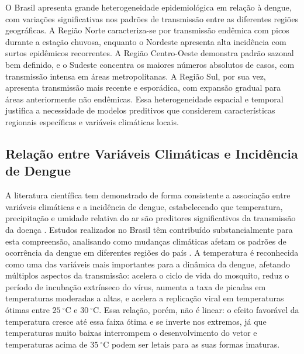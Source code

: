 O Brasil apresenta grande heterogeneidade epidemiológica em relação à dengue, com variações significativas nos padrões de transmissão entre as diferentes regiões geográficas. A Região Norte caracteriza-se por transmissão endêmica com picos durante a estação chuvosa, enquanto o Nordeste apresenta alta incidência com surtos epidêmicos recorrentes. A Região Centro-Oeste demonstra padrão sazonal bem definido, e o Sudeste concentra os maiores números absolutos de casos, com transmissão intensa em áreas metropolitanas. A Região Sul, por sua vez, apresenta transmissão mais recente e esporádica, com expansão gradual para áreas anteriormente não endêmicas. Essa heterogeneidade espacial e temporal justifica a necessidade de modelos preditivos que considerem características regionais específicas e variáveis climáticas locais.

\subsection{Relação entre Variáveis Climáticas e Incidência de Dengue}

A literatura científica tem demonstrado de forma consistente a associação entre variáveis climáticas e a incidência de dengue, estabelecendo que temperatura, precipitação e umidade relativa do ar são preditores significativos da transmissão da doença \cite{analysis_climate_factors_dengue,the_occurrence_dengue_weather_brazil}. Estudos realizados no Brasil têm contribuído substancialmente para esta compreensão, analisando como mudanças climáticas afetam os padrões de ocorrência da dengue em diferentes regiões do país \cite{the_occurrence_dengue_weather_brazil,health_impact_dengue_precipitation_sp}. A temperatura é reconhecida como uma das variáveis mais importantes para a dinâmica da dengue, afetando múltiplos aspectos da transmissão: acelera o ciclo de vida do mosquito, reduz o período de incubação extrínseco do vírus, aumenta a taxa de picadas em temperaturas moderadas a altas, e acelera a replicação viral em temperaturas ótimas entre $25~^\circ\mathrm{C}$ e $30~^\circ\mathrm{C}$. Essa relação, porém, não é linear: o efeito favorável da temperatura cresce até essa faixa ótima e se inverte nos extremos, já que temperaturas muito baixas interrompem o desenvolvimento do vetor e temperaturas acima de $35~^\circ\mathrm{C}$ podem ser letais para as suas formas imaturas.

